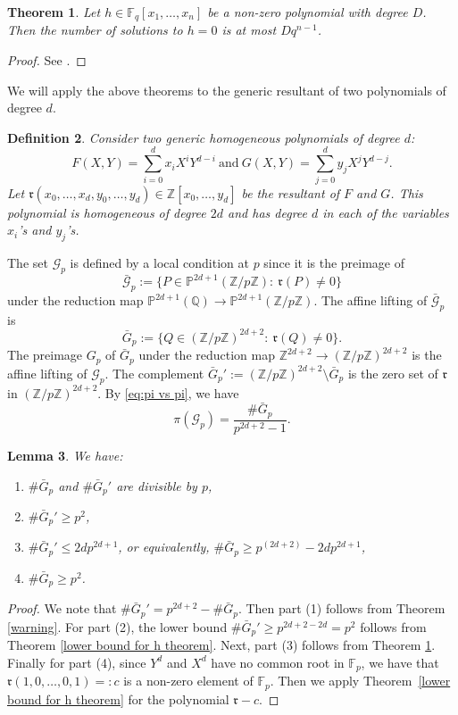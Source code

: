 \documentclass[12pt]{amsart}
\newtheorem{theorem}{Theorem}[section]
\newtheorem{lemma}[theorem]{Lemma}
\newtheorem{definition}[theorem]{Definition}
\newcommand{\Z}{\mathbb{Z}}
\newcommand{\Q}{\mathbb{Q}}
\newcommand{\cG}{\mathcal{G}}
\newcommand{\F}{\mathbb{F}}
\numberwithin{equation}{section}
\begin{document}
\begin{theorem}\label{d q n-1}
    Let $h\in \F_q[x_1, \dots, x_n]$ be a non-zero polynomial with degree $D$. Then the number of solutions to $h=0$ is at most $D q^{n-1}$. 
\end{theorem}
\begin{proof}
 See \cite[Theorem 6.13]{lidlnied}. 
\end{proof}

We will apply the above theorems to the generic resultant of two polynomials of degree $d$.
\begin{definition}\label{def:generic resultant}
    Consider two generic homogeneous polynomials of degree $d$:
    $$F(X,Y)=\sum_{i=0}^d x_iX^iY^{d-i}\ \text{and}\ G(X,Y)=\sum_{j=0}^{d} y_jX^jY^{d-j}.$$
    Let $\mathfrak{r}(x_0,\ldots,x_d,y_0,\ldots,y_d)\in\Z[x_0,\ldots,y_d]$ be the resultant of $F$ and $G$. This polynomial is homogeneous of degree $2d$ and has degree $d$ in each of the variables $x_i$'s and $y_j$'s.
\end{definition}

The set $\cG_p$ is defined by a local condition at $p$ since it is the preimage
of
$$\bar{\cG}_p:=\{P\in\mathbb{P}^{2d+1}(\Z/p\Z):\ \mathfrak{r}(P)\neq 0\}$$
under the reduction map $\mathbb{P}^{2d+1}(\Q)\rightarrow\mathbb{P}^{2d+1}(\Z/p\Z)$. The affine lifting of $\bar{\cG}_p$ is
$$\bar{G}_p:=\{Q\in(\Z/p\Z)^{2d+2}:\ \mathfrak{r}(Q)\neq 0\}.$$
The preimage $G_p$ of $\bar{G}_p$ under the reduction map
$\Z^{2d+2}\rightarrow (\Z/p\Z)^{2d+2}$ is the affine lifting of $\cG_p$. 
The complement $\bar{G}_p':=(\Z/p\Z)^{2d+2}\setminus\bar{G}_p$ is the zero set of
$\mathfrak{r}$ in $(\Z/p\Z)^{2d+2}$. By \eqref{eq:pi vs pi}, we have
\begin{equation}\label{eq:pi(cG_p)}
    \pi(\cG_p)=\frac{\#\bar{G}_p}{p^{2d+2}-1}.
\end{equation}

\begin{lemma}\label{2d p to the 2d+1}
     We have:
     \begin{enumerate}
         \item $\#\bar{G}_p$ and $\#\bar{G}_p'$ are divisible by $p$,
         \item $\#\bar{G}_p'\geq p^2$,
         \item $\#\bar{G}_p'\leq 2d p^{2d+1}$, or equivalently, $\#\bar{G}_p\geq p^{(2d+2)}-2d p^{2d+1}$, 
         \item $\# \bar{G}_p\geq p^2$. 
     \end{enumerate}
 \end{lemma}
\begin{proof}
     We note that $\#\bar{G}_p'=p^{2d+2}-\#\bar{G}_p$. Then part (1) follows from Theorem \ref{warning}. For part (2), the lower bound $\#\bar{G}_p'\geq p^{2d+2-2d}=p^2$ follows from Theorem \ref{lower bound for h theorem}. Next, part (3) follows from Theorem \ref{d q n-1}. Finally for part (4), since $Y^d$ and $X^d$ have no common root in $\mathbb{F}_p$, we have that
     $\mathfrak{r}(1,0,\ldots,0,1)=:c$ is a non-zero element of $\mathbb{F}_p$. Then we apply  Theorem~\ref{lower bound for h theorem} for the polynomial $\mathfrak{r}-c$. 
\end{proof}
\end{document}
